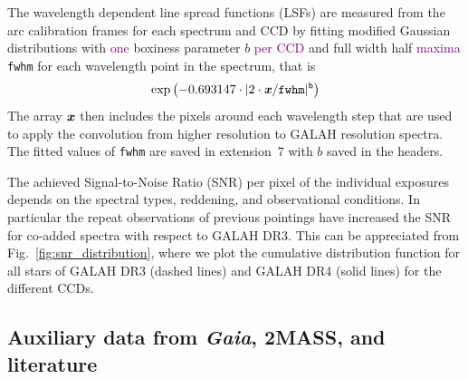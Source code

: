 \documentclass[
  journal=pasa,
  manuscript=research-paper, %
  year=2024,
  volume=37
]{cup-journal}
\newcommand{\adjusted}[1]{{\textcolor{purple}{#1}}}
\newcommand{\Gaia}{\textit{Gaia}\xspace}
\begin{document}
The wavelength dependent line spread functions (LSFs) are measured from the arc calibration frames for each spectrum and CCD by fitting modified Gaussian distributions with \adjusted{one} boxiness parameter $b$ \adjusted{per CCD} and full width half \adjusted{maxima} \texttt{fwhm} for each wavelength point in the spectrum, that is
\begin{align}
    \exp \left(-0.693147 \cdot \vert 2 \cdot \textbf{\textit{x}}/\texttt{fwhm} \vert^\texttt{b}\right) \label{eq:lsf}
\end{align}
The array $\textbf{\textit{x}}$ then includes the pixels around each wavelength step that are used to apply the convolution from higher resolution to GALAH resolution spectra. The fitted values of \texttt{fwhm} are saved in extension~7 with $b$ saved in the headers.

The achieved Signal-to-Noise Ratio (SNR) per pixel of the individual exposures depends on the spectral types, reddening, and observational conditions. In particular the repeat observations of previous pointings have increased the SNR for co-added spectra with respect to GALAH DR3. This can be appreciated from Fig.~\ref{fig:snr_distribution}, where we plot the cumulative distribution function for all stars of GALAH DR3 (dashed lines) and GALAH DR4 (solid lines) for the different CCDs. 

\subsection{Auxiliary data from \Gaia, 2MASS, and literature} \label{sec:non-spec_data}

\end{document}
